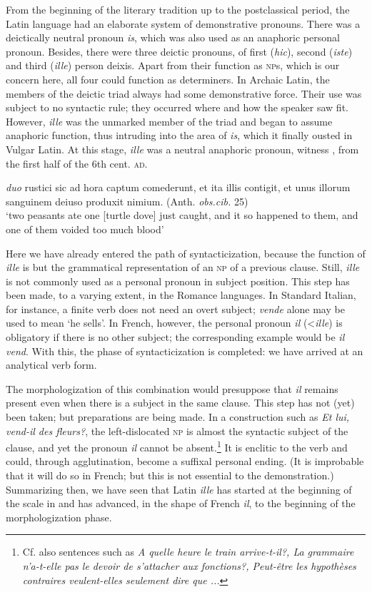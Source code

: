 From the beginning of the literary tradition up to the postclassical period, the Latin language had an elaborate system of demonstrative pronouns. There was a deictically neutral pronoun \textit{is}, which was also used as an anaphoric personal pronoun. Besides, there were three deictic pronouns, of first (\textit{hic}), second (\textit{iste}) and third (\textit{ille}) person deixis. Apart from their function as \textsc{np}s, which is our concern here, all four could function as determiners. In Archaic Latin, the members of the deictic triad always had some demonstrative force. Their use was subject to no syntactic rule; they occurred where and how the speaker saw fit. However, \textit{ille} was the unmarked member of the triad and began to assume anaphoric function, thus intruding into the area of \textit{is}, which it finally ousted in Vulgar Latin. At this stage, \textit{ille} was a neutral anaphoric pronoun, witness , from the first half of the 6th cent. \textsc{ad}.

\ea\label{ex:}
 \textit{duo} rustici sic ad hora captum comederunt, et ita illis contigit, et unus illorum sanguinem deiuso produxit nimium.  (Anth. \textit{obs.cib.} 25)\\
\glt ‘two peasants ate one [turtle dove] just caught, and it so happened to them, and one of them voided too much blood’  \citep[288]{Pulgram1978}\\
\z

Here we have already entered the path of syntacticization, because the function of \textit{ille} is but the grammatical representation of an \textsc{np} of a previous clause. Still, \textit{ille} is not commonly used as a personal pronoun in subject position. This step has been made, to a varying extent, in the Romance languages. In Standard Italian, for instance, a finite verb does not need an overt subject; \textit{vende} alone may be used to mean ‘he sells’. In French, however, the personal pronoun \textit{il} ({\textless}\textit{ille}) is obligatory if there is no other subject; the corresponding example would be \textit{il vend}. With this, the phase of syntacticization is completed: we have arrived at an analytical verb form.

The morphologization of this combination would presuppose that \textit{il} remains present even when there is a subject in the same clause. This step has not (yet) been taken; but preparations are being made. In a construction such as \textit{Et lui, vend-il des fleurs?}, the left-dislocated \textsc{np} is almost the syntactic subject of the clause, and yet the pronoun \textit{il} cannot be absent.\footnote{Cf. also sentences such as \textit{A quelle heure le train arrive-t-il?, La grammaire n'a-t-elle pas le devoir de s'attacher aux fonctions?, Peut-être les hypothèses contraires veulent-elles seulement dire que ...}} It is enclitic to the verb and could, through agglutination, become a suffixal personal ending. (It is improbable that it will do so in French; but this is not essential to the demonstration.) Summarizing then, we have seen that Latin \textit{ille} has started at the beginning of the scale in  and has advanced, in the shape of French \textit{il}, to the beginning of the morphologization phase.

